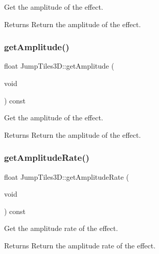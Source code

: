 Get the amplitude of the effect. 

\begin{DoxyReturn}{Returns}
Return the amplitude of the effect. 
\end{DoxyReturn}
\mbox{\label{classJumpTiles3D_a3eb2d1214dcaa28f1ea5c35ad153cb47}} 
\subsubsection{\texorpdfstring{get\+Amplitude()}{getAmplitude()}\hspace{0.1cm}{\footnotesize\ttfamily [2/2]}}
{\footnotesize\ttfamily float Jump\+Tiles3\+D\+::get\+Amplitude (\begin{DoxyParamCaption}\item[{void}]{ }\end{DoxyParamCaption}) const\hspace{0.3cm}{\ttfamily [inline]}}



Get the amplitude of the effect. 

\begin{DoxyReturn}{Returns}
Return the amplitude of the effect. 
\end{DoxyReturn}
\mbox{\label{classJumpTiles3D_aadb1cb0d358f196db393dd09caa1bea5}} 
\subsubsection{\texorpdfstring{get\+Amplitude\+Rate()}{getAmplitudeRate()}\hspace{0.1cm}{\footnotesize\ttfamily [1/2]}}
{\footnotesize\ttfamily float Jump\+Tiles3\+D\+::get\+Amplitude\+Rate (\begin{DoxyParamCaption}\item[{void}]{ }\end{DoxyParamCaption}) const\hspace{0.3cm}{\ttfamily [inline]}}



Get the amplitude rate of the effect. 

\begin{DoxyReturn}{Returns}
Return the amplitude rate of the effect. 
\end{DoxyReturn}
\mbox{\label{classJumpTiles3D_aadb1cb0d358f196db393dd09caa1bea5}} 
